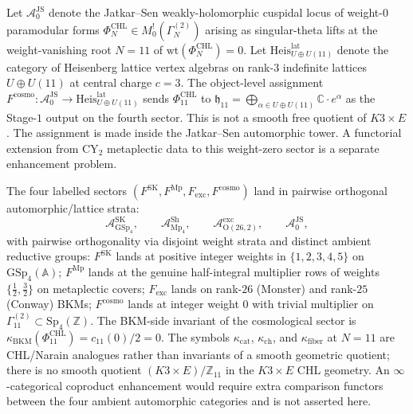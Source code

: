 \begin{definition}
\label{def:k3e-F-cosmo}
Let $\mathcal{A}^{\mathrm{JS}}_0$ denote the Jatkar--Sen
weakly-holomorphic cuspidal locus of weight-$0$ paramodular forms
$\Phi^{\mathrm{CHL}}_N \in M^!_0(\Gamma^{(2)}_N)$ arising as
singular-theta lifts at the weight-vanishing root $N = 11$ of
$\mathrm{wt}(\Phi^{\mathrm{CHL}}_N) = 0$. Let
$\mathrm{Heis}^{\mathrm{lat}}_{U \oplus U(11)}$ denote the category of
Heisenberg lattice vertex algebras on rank-$3$ indefinite lattices
$U \oplus U(11)$ at central charge $c = 3$. The object-level assignment
$F^{\mathrm{cosmo}}: \mathcal{A}^{\mathrm{JS}}_0 \to
\mathrm{Heis}^{\mathrm{lat}}_{U \oplus U(11)}$ sends
$\Phi^{\mathrm{CHL}}_{11}$ to
$\mathfrak{h}_{11} = \bigoplus_{\alpha \in U \oplus U(11)}
\mathbb{C} \cdot e^\alpha$ as the Stage-$1$ output on the fourth
sector. This is not a smooth free quotient of $K3\times E$.
The assignment is made inside the Jatkar--Sen automorphic tower. A
functorial extension from CY$_2$ metaplectic data to this weight-zero
sector is a separate enhancement problem.
\end{definition}

\begin{theorem}
\label{thm:k3e-quadfurcation}
The four labelled sectors
$(F^{\mathrm{SK}}, F^{\mathrm{Mp}}, F_{\mathrm{exc}}, F^{\mathrm{cosmo}})$
land in pairwise orthogonal automorphic/lattice strata:
\[
\mathcal{A}^{\mathrm{SK}}_{\mathrm{GSp}_4},\qquad
\mathcal{A}^{\mathrm{Sh}}_{\mathrm{Mp}_4},\qquad
\mathcal{A}^{\mathrm{exc}}_{\mathrm{O}(26, 2)},\qquad
\mathcal{A}^{\mathrm{JS}}_0,
\]
with pairwise orthogonality via disjoint weight strata and distinct
ambient reductive groups: $F^{\mathrm{SK}}$ lands at positive integer
weights in $\{1,2,3,4,5\}$ on $\mathrm{GSp}_4(\mathbb{A})$;
$F^{\mathrm{Mp}}$ lands at the genuine half-integral multiplier rows
of weights $\{\tfrac12,\tfrac32\}$ on metaplectic covers;
$F_{\mathrm{exc}}$ lands on rank-$26$ (Monster) and rank-$25$ (Conway)
BKMs; $F^{\mathrm{cosmo}}$ lands at integer weight $0$ with trivial
multiplier on $\Gamma^{(2)}_{11} \subset \mathrm{Sp}_4(\mathbb{Z})$.
The BKM-side invariant of the cosmological sector is
$\kappa_{\mathrm{BKM}}(\Phi^{\mathrm{CHL}}_{11})=c_{11}(0)/2=0$.
The symbols $\kappa_{\mathrm{cat}}$, $\kappa_{\mathrm{ch}}$, and
\(\kappa_{\mathrm{fiber}}\) at \(N=11\) are CHL/Narain analogues rather
than invariants of a smooth geometric quotient; there is no smooth quotient
$(K3\times E)/\mathbb{Z}_{11}$ in the $K3\times E$ CHL geometry.
An \(\infty\)-categorical coproduct enhancement would require extra
comparison functors between the four ambient automorphic categories and
is not asserted here.
\end{theorem}

